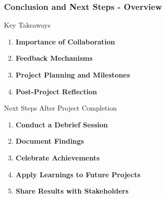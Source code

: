 \documentclass[aspectratio=169]{beamer}
\begin{document}
\begin{frame}[fragile]
    \frametitle{Conclusion and Next Steps - Overview}
    
    \begin{block}{Key Takeaways}
        \begin{enumerate}
            \item \textbf{Importance of Collaboration}
            \item \textbf{Feedback Mechanisms}
            \item \textbf{Project Planning and Milestones}
            \item \textbf{Post-Project Reflection}
        \end{enumerate}
    \end{block}
    
    \begin{block}{Next Steps After Project Completion}
        \begin{enumerate}
            \item \textbf{Conduct a Debrief Session}
            \item \textbf{Document Findings}
            \item \textbf{Celebrate Achievements}
            \item \textbf{Apply Learnings to Future Projects}
            \item \textbf{Share Results with Stakeholders}
        \end{enumerate}
    \end{block}
\end{frame}
\end{document}
